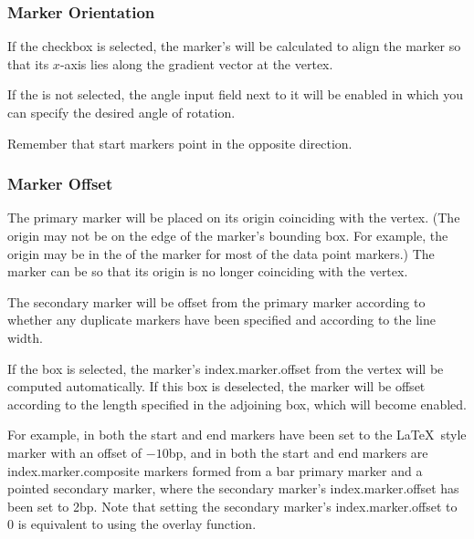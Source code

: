 \subsubsection{Marker Orientation}\label{sec:markerorientation}


If the  checkbox is selected,
the marker's  will be
calculated to align the marker so that its $x$-axis lies along the
gradient vector at the vertex. 

If the  is not selected, the angle input
field next to it will be enabled in which you can specify the
desired angle of rotation.

\begin{important}
Remember that start markers point in the opposite direction.
\end{important}

\subsubsection{Marker Offset}\label{sec:markeroffset}

The primary marker will be placed on its origin coinciding with the
vertex. (The origin may not be on the edge of the marker's bounding
box. For example, the origin may be in the  of the
marker for most of the data point markers.)
The marker can be 
so that its origin is no longer coinciding with the vertex.

The secondary marker will be offset from the primary marker
according to whether any duplicate markers have been specified and
according to the line width.


If the  box is selected, the marker's
\gls{index.marker.offset} from the vertex will be computed automatically. 
If this box is deselected, the marker will be offset according to
the length specified in the adjoining box, which will become
enabled.

For example, in  both the start and end
markers have been set to the \LaTeX\ style marker with an offset of
$-10$\gls{bp}, and in  both the start
and end markers are \gls{index.marker.composite} markers formed from
a bar primary marker and a pointed secondary marker, where the
secondary marker's \gls{index.marker.offset} has been set to
2\gls{bp}.  Note that setting the secondary marker's \gls{index.marker.offset}
to 0 is equivalent to using the overlay function.

